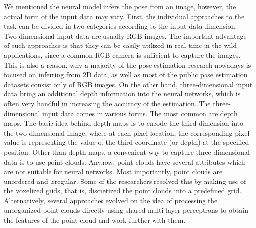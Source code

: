 We mentioned the neural model infers the pose from an image, however, the actual form of the input data may vary. First, the individual approaches to the task can be divided in two categories according to the input data dimension. Two-dimensional input data are usually RGB images. The important advantage of such approaches is that they can be easily utilized in real-time in-the-wild applications, since a common RGB camera is sufficient to capture the images. This is also a reason, why a majority of the pose estimation research nowadays is focused on inferring from 2D data, as well as most of the public pose estimation datasets consist only of RGB images. On the other hand, three-dimensional input data bring an additional depth information into the neural networks, which is often very handful in increasing the accuracy of the estimation. The three-dimensional input data comes in various forms. The most common are depth maps. The basic idea behind depth maps is to encode the third dimension into the two-dimensional image, where at each pixel location, the corresponding pixel value is representing the value of the third coordinate (or depth) at the specified position. Other than depth maps, a convenient way to capture three-dimensional data is to use point clouds. Anyhow, point clouds have several attributes which are not suitable for neural networks. Most importantly, point clouds are unordered and irregular. Some of the researchers resolved this by making use of the voxelized grids, that is, discretized the point clouds into a predefined grid. Alternatively, several approaches evolved on the idea of processing the unorganized point clouds directly using shared multi-layer perceptrons to obtain the features of the point cloud and work further with them.\par


